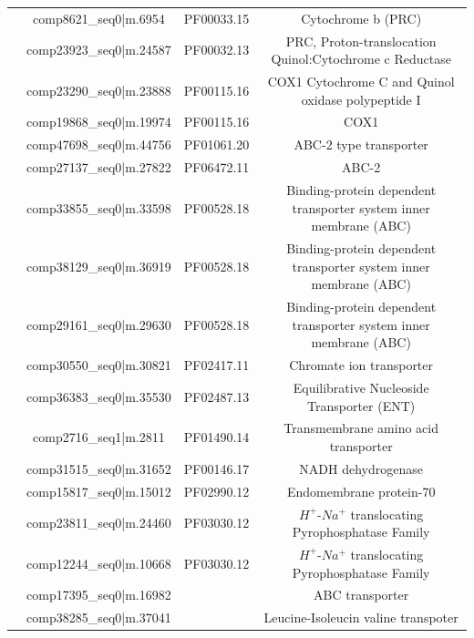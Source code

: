 \begin{table}
\begin{tabular}{|c|c|c|c|}
                            & comp8621\_seq0|m.6954   & PF00033.15 & Cytochrome b (PRC) \\
                            & comp23923\_seq0|m.24587 & PF00032.13 & PRC, Proton-translocation Quinol:Cytochrome c Reductase\\
                            & comp23290\_seq0|m.23888 & PF00115.16 & COX1 Cytochrome C and Quinol oxidase polypeptide I \\
                            & comp19868\_seq0|m.19974 & PF00115.16 & COX1 \\
                            & comp47698\_seq0|m.44756 & PF01061.20 & ABC-2 type transporter \\
                            & comp27137\_seq0|m.27822 & PF06472.11 & ABC-2 \\
                            & comp33855\_seq0|m.33598 & PF00528.18 & Binding-protein dependent transporter system inner membrane (ABC)\\
                            & comp38129\_seq0|m.36919 & PF00528.18 & Binding-protein dependent transporter system inner membrane (ABC)\\ 
                            & comp29161\_seq0|m.29630 & PF00528.18 & Binding-protein dependent transporter system inner membrane (ABC)\\
                            & comp30550\_seq0|m.30821 & PF02417.11 & Chromate ion transporter \\
                            & comp36383\_seq0|m.35530 & PF02487.13 & Equilibrative Nucleoside Transporter (ENT)\\
                            & comp2716\_seq1|m.2811   & PF01490.14 & Transmembrane amino acid transporter \\
                            & comp31515\_seq0|m.31652 & PF00146.17 & NADH dehydrogenase \\
                            & comp15817\_seq0|m.15012 & PF02990.12 & Endomembrane protein-70 \\
                            & comp23811\_seq0|m.24460 & PF03030.12 & \(H^{+}\)-\(Na^{+}\) translocating Pyrophosphatase Family \\
                            & comp12244\_seq0|m.10668 & PF03030.12 & \(H^{+}\)-\(Na^{+}\) translocating Pyrophosphatase Family \\
                            & comp17395\_seq0|m.16982 &  & ABC transporter \\ 
                            & comp38285\_seq0|m.37041 & & Leucine-Isoleucin valine transpoter \\

\end{tabular}
\end{table}
